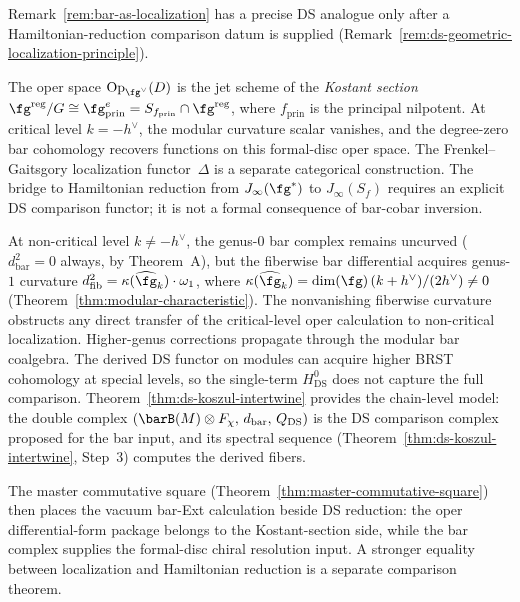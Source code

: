\begin{remark}
\label{rem:oper-as-kostant-slice}
Remark~\ref{rem:bar-as-localization} has a precise DS analogue only
after a Hamiltonian-reduction comparison datum is supplied
(Remark~\ref{rem:ds-geometric-localization-principle}).

The oper space $\mathrm{Op}_{\fg^\vee}(D)$ is the jet scheme of the
\emph{Kostant section}
$\fg^{\mathrm{reg}} / G \cong \fg^e_{\mathrm{prin}} =
S_{f_{\mathrm{prin}}} \cap \fg^{\mathrm{reg}}$,
where $f_{\mathrm{prin}}$ is the principal nilpotent. At critical
level $k = -h^\vee$, the modular curvature scalar vanishes, and the
degree-zero bar cohomology recovers functions on this formal-disc
oper space. The Frenkel--Gaitsgory localization functor~$\Delta$ is a
separate categorical construction. The bridge to Hamiltonian
reduction from $J_\infty(\fg^*)$ to $J_\infty(S_f)$ requires an
explicit DS comparison functor; it is not a formal consequence of
bar-cobar inversion.

At non-critical level $k \neq -h^\vee$, the genus-$0$ bar complex
remains uncurved ($d_{\mathrm{bar}}^2 = 0$ always, by Theorem~A),
but the fiberwise bar differential acquires genus-$1$ curvature
$d_{\mathrm{fib}}^2 = \kappa(\widehat{\fg}_k) \cdot \omega_1$, where $\kappa(\widehat{\fg}_k) = \dim(\fg)\,(k+h^\vee)/(2h^\vee)
\neq 0$
(Theorem~\ref{thm:modular-characteristic}).
The nonvanishing fiberwise curvature obstructs any direct transfer of
the critical-level oper calculation to non-critical localization.
Higher-genus corrections propagate through the modular bar coalgebra.
The derived DS functor on modules can acquire higher BRST cohomology
at special levels, so the single-term $H^0_{\mathrm{DS}}$ does not
capture the full comparison.
Theorem~\ref{thm:ds-koszul-intertwine} provides the chain-level
model: the double complex
$(\barB(M) \otimes F_\chi,\, d_{\mathrm{bar}},\, Q_{\mathrm{DS}})$
is the DS comparison complex proposed for the bar input, and its
spectral sequence
(Theorem~\ref{thm:ds-koszul-intertwine}, Step~3) computes the
derived fibers.

The master commutative square
(Theorem~\ref{thm:master-commutative-square})
then places the vacuum bar-Ext calculation beside DS reduction: the
oper differential-form package belongs to the Kostant-section side,
while the bar complex supplies the formal-disc chiral resolution
input. A stronger equality between localization and Hamiltonian
reduction is a separate comparison theorem.
\end{remark}


